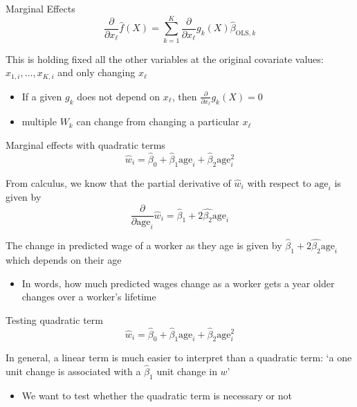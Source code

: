 \documentclass[aspectratio=169,t,11pt,table]{beamer}
\begin{document}
\begin{frame}{Marginal Effects}
  $$
    \frac{\partial}{\partial x_\ell} \hat{f}(X) = \sum_{k=1}^K \frac{\partial}{\partial x_\ell} g_{k}(X) \hat{\beta}_{\text{OLS}, k}
  $$
  
  \bigskip
  This is holding fixed all the other variables at the original covariate values: $x_{1,i}, \dots, x_{K,i}$ and only changing $x_{\ell}$
  \begin{itemize}
    \item If a given $g_k$ does not depend on $x_\ell$, then $\frac{\partial}{\partial x_\ell} g_{k}(X) = 0$
    
    \item multiple $W_k$ can change from changing a particular $x_{\ell}$ 
  \end{itemize}
\end{frame}

\begin{frame}{Marginal effects with quadratic terms}
  \vspace{-\bigskipamount}
  $$
    \hat{w}_i = \hat{\beta}_0 + \hat{\beta}_1 \text{age}_i + \hat{\beta}_2 \text{age}_i^2
  $$

  \bigskip
  From calculus, we know that the partial derivative of $\hat{w}_i$ with respect to $\text{age}_i$ is given by 
  $$
    \frac{\partial}{\partial \text{age}_i} \hat{w}_i = \hat{\beta}_1 + 2 \hat{\beta_2} \text{age}_i
  $$
  
  \pause
  \bigskip
  The change in predicted wage of a worker as they age is given by $\hat{\beta}_1 + 2 \hat{\beta_2} \text{age}_i$ which depends on their age
  \begin{itemize}
    \item In words, how much predicted wages change as a worker gets a year older changes over a worker's lifetime
  \end{itemize}
\end{frame}


\begin{frame}{Testing quadratic term}
  \vspace{-\bigskipamount}
  $$
    \hat{w}_i = \hat{\beta}_0 + \hat{\beta}_1 \text{age}_i + \hat{\beta}_2 \text{age}_i^2
  $$

  \bigskip
  In general, a linear term is much easier to interpret than a quadratic term: `a one unit change is associated with a $\hat{\beta}_1$ unit change in $w$'
  \begin{itemize}
    \item We want to test whether the quadratic term is necessary or not
  \end{itemize}
\end{frame}
\end{document}
